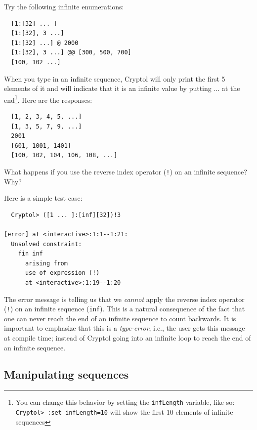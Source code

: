 \begin{Exercise}\label{ex:seq:9}
Try the following infinite enumerations:
\begin{Verbatim}
  [1:[32] ... ]
  [1:[32], 3 ...]
  [1:[32] ...] @ 2000
  [1:[32], 3 ...] @@ [300, 500, 700]
  [100, 102 ...]
\end{Verbatim}
\end{Exercise}
\begin{Answer}
  When you type in an infinite sequence, Cryptol will only print the
  first 5 elements of it and will indicate that it is an infinite value
  by putting $\ldots$ at the end\footnote{You can change this behavior
    by setting the {\tt infLength} variable, like so: {\tt Cryptol>
      :set infLength=10} will show the first 10 elements of infinite
    sequences}. Here are the responses:
\begin{Verbatim}
  [1, 2, 3, 4, 5, ...]
  [1, 3, 5, 7, 9, ...]
  2001
  [601, 1001, 1401]
  [100, 102, 104, 106, 108, ...]
\end{Verbatim}
\end{Answer}
\begin{Exercise}\label{ex:seq:10}
  What happens if you use the reverse index operator ({\tt !}) on an
  infinite sequence? Why?
\end{Exercise}
\begin{Answer}
Here is a simple test case:
\begin{Verbatim}
  Cryptol> ([1 ... ]:[inf][32])!3

[error] at <interactive>:1:1--1:21:
  Unsolved constraint:
    fin inf
      arising from
      use of expression (!)
      at <interactive>:1:19--1:20
\end{Verbatim}
The error message is telling us that we {\em cannot} apply the reverse
index operator ({\tt !}) on an infinite sequence (\texttt{inf}).  This
is a natural consequence of the fact that one can never reach the end
of an infinite sequence to count backwards.  It is important to
emphasize that this is a {\em type-error}, i.e., the user gets this
message at compile time; instead of Cryptol going into an infinite
loop to reach the end of an infinite sequence.
\end{Answer}

\subsection{Manipulating sequences} 
\label{sec:manip-sequ}

